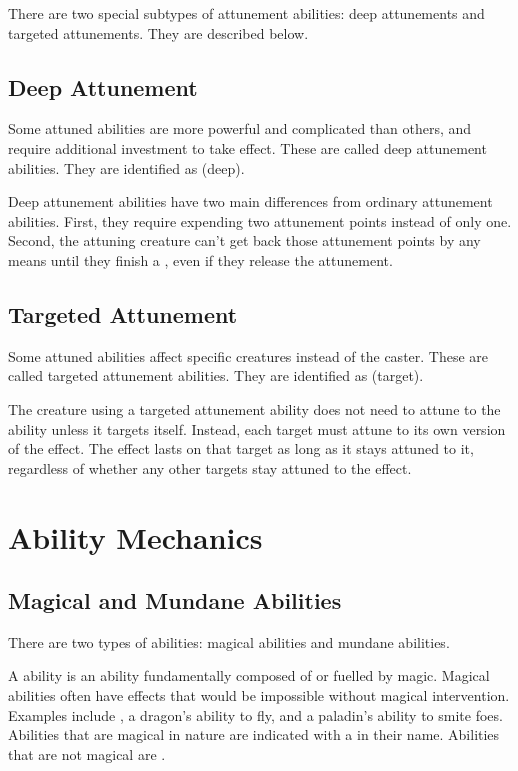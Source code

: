     There are two special subtypes of attunement abilities: deep attunements and targeted attunements.
    They are described below.

    \subsection{Deep Attunement}\label{Deep Attunement}
        Some attuned abilities are more powerful and complicated than others, and require additional investment to take effect.
        These are called deep attunement abilities.
        They are identified as  (deep).

        Deep attunement abilities have two main differences from ordinary attunement abilities.
        First, they require expending two attunement points instead of only one.
        Second, the attuning creature can't get back those attunement points by any means until they finish a , even if they release the attunement.

    \subsection{Targeted Attunement}\label{Targeted Attunement}
        Some attuned abilities affect specific creatures instead of the caster.
        These are called targeted attunement abilities.
        They are identified as  (target).

        The creature using a targeted attunement ability does not need to attune to the ability unless it targets itself.
        Instead, each target must attune to its own version of the effect.
        The effect lasts on that target as long as it stays attuned to it, regardless of whether any other targets stay attuned to the effect.

\section{Ability Mechanics}\label{Ability Mechanics}

    \subsection{Magical and Mundane Abilities}\label{Magical and Mundane Abilities}

        There are two types of abilities: magical abilities and mundane abilities.

        \label{Magical Abilities} A \magical ability is an ability fundamentally composed of or fuelled by magic.
        Magical abilities often have effects that would be impossible without magical intervention.
        Examples include , a dragon's ability to fly, and a paladin's ability to smite foes.
        Abilities that are magical in nature are indicated with a \sparkle in their name.
        Abilities that are not magical are .

